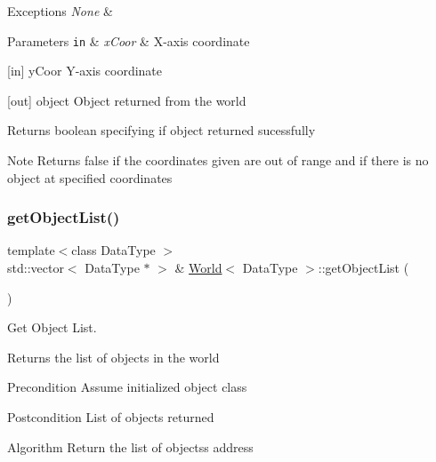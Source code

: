 \begin{DoxyExceptions}{Exceptions}
{\em None} & \\
\hline
\end{DoxyExceptions}

\begin{DoxyParams}[1]{Parameters}
\mbox{\tt in}  & {\em x\+Coor} & X-\/axis coordinate\\
\hline
\end{DoxyParams}
\mbox{[}in\mbox{]} y\+Coor Y-\/axis coordinate

\mbox{[}out\mbox{]} object Object returned from the world

\begin{DoxyReturn}{Returns}
boolean specifying if object returned sucessfully
\end{DoxyReturn}
\begin{DoxyNote}{Note}
Returns false if the coordinates given are out of range and if there is no object at specified coordinates 
\end{DoxyNote}
\hypertarget{class_world_ac2f52f8f041d578ca4f0583349c8f43f}{}\label{class_world_ac2f52f8f041d578ca4f0583349c8f43f} 
\subsubsection{\texorpdfstring{get\+Object\+List()}{getObjectList()}}
{\footnotesize\ttfamily template$<$class Data\+Type $>$ \\
std\+::vector$<$ Data\+Type $\ast$ $>$ \& \hyperlink{class_world}{World}$<$ Data\+Type $>$\+::get\+Object\+List (\begin{DoxyParamCaption}{ }\end{DoxyParamCaption})}



Get Object List. 

Returns the list of objects in the world

\begin{DoxyPrecond}{Precondition}
Assume initialized object class
\end{DoxyPrecond}
\begin{DoxyPostcond}{Postcondition}
List of objects returned
\end{DoxyPostcond}
\begin{DoxyParagraph}{Algorithm}
Return the list of objects\textquotesingle{}s address
\end{DoxyParagraph}

